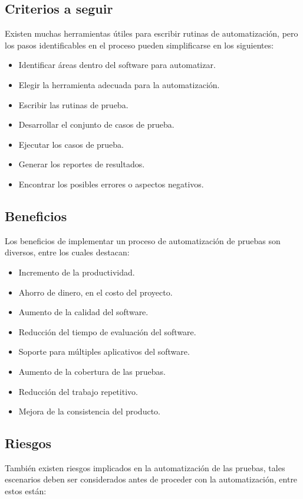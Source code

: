 \subsection{Criterios a seguir}
Existen muchas herramientas útiles para escribir rutinas de automatización, pero
los pasos identificables en el proceso pueden simplificarse en los siguientes:

\begin{itemize}
    \item Identificar áreas dentro del software para automatizar.
    \item Elegir la herramienta adecuada para la automatización.
    \item Escribir las rutinas de prueba.
    \item Desarrollar el conjunto de casos de prueba.
    \item Ejecutar los casos de prueba.
    \item Generar los reportes de resultados.
    \item Encontrar los posibles errores o aspectos negativos.
\end{itemize}

\subsection{Beneficios}
Los beneficios de implementar un proceso de automatización de pruebas son
diversos, entre los cuales destacan:

\begin{itemize}
    \item Incremento de la productividad.
    \item Ahorro de dinero, en el costo del proyecto.
    \item Aumento de la calidad del software.
    \item Reducción del tiempo de evaluación del software.
    \item Soporte para múltiples aplicativos del software.
    \item Aumento de la cobertura de las pruebas.
    \item Reducción del trabajo repetitivo.
    \item Mejora de la consistencia del producto.
\end{itemize}

\subsection{Riesgos}
También existen riesgos implicados en la automatización de las pruebas, tales
escenarios deben ser considerados antes de proceder con la automatización, entre
estos están:

